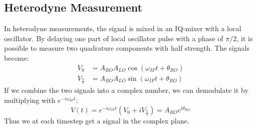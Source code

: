 


\subsection{Heterodyne Measurement}\label{sec:heterodyne_measurement}
In heterodyne measurements, the signal is mixed in an IQ-mixer with a local oscillator. By delaying one part of local oscillator pulse with a phase of $\pi / 2$, it is possible to measure two quadrature components with half strength. The signals become:
\begin{align}
    V_0               &= A_{RO}A_{LO} \cos(\omega_{IF}t + \theta_{RO}) \\
    V_{\frac{\pi}{2}} &= A_{RO}A_{LO} \sin(\omega_{IF}t + \theta_{RO})
\end{align}
If we combine the two signals into a complex number, we can demodulate it by multiplying with $e^{-i\omega_{IF}t}$:
\begin{equation}
    V(t) = e^{-i\omega_{IF} t} (V_0 + i V_{\frac{\pi}{2}}) = A_{RO} e^{i\theta_{RO}}
\end{equation}
Thus we at each timestep get a signal in the complex plane. 


